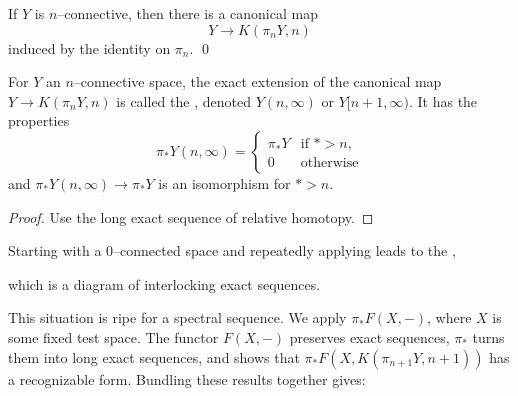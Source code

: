 \begin{corollary}
If $Y$ is $n$--connective, then there is a canonical map \[Y \to K(\pi_n Y, n)\] induced by the identity on $\pi_n$. \qed
\end{corollary}

\begin{corollary}\label{PostnikovTruncationsExist}
For $Y$ an $n$--connective space, the exact extension of the canonical map $Y \to K(\pi_n Y, n)$ is called the , denoted $Y(n, \infty)$ or $Y[n+1, \infty)$.
It has the properties \[\pi_* Y(n, \infty) = \begin{cases} \pi_* Y & \text{if $* > n$}, \\ 0 & \text{otherwise} \end{cases}\] and $\pi_* Y(n, \infty) \to \pi_* Y$ is an isomorphism for $* > n$.
\end{corollary}
\begin{proof}
Use the long exact sequence of relative homotopy.
\end{proof}

\begin{definition}
Starting with a $0$--connected space and repeatedly applying  leads to the ,

\begin{figure*}[h]
\begin{center}
\end{center}
\end{figure*}

\noindent
which is a diagram of interlocking exact sequences.
\end{definition}

This situation is ripe for a spectral sequence.
We apply $\pi_* F(X, -)$, where $X$ is some fixed test space.  The functor $F(X, -)$ preserves exact sequences, $\pi_*$ turns them into long exact sequences, and  shows that $\pi_* F(X, K(\pi_{n+1} Y, n+1))$ has a recognizable form.
Bundling these results together gives:

